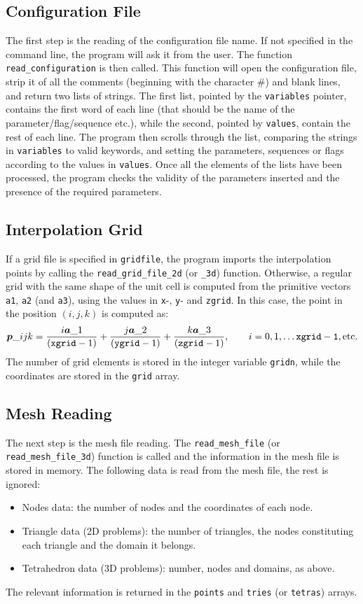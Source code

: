 \documentclass[11pt,a4paper,oneside]{article}
\begin{document}
\subsection{Configuration File}
The first step is the reading of the configuration file name. If not specified in the command line, the program will ask it from the user.
The function {\tt read\_configuration} is then called. This function will open the configuration file, strip it of all the comments (beginning with the character \#) and blank lines, and return two lists of strings. The first list, pointed by the {\tt variables} pointer, contains the first word of each line (that should be the name of the parameter/flag/sequence etc.), while the second, pointed by {\tt values}, contain the rest of each line. The program then scrolls through the list, comparing the strings in {\tt variables} to valid keywords, and setting the parameters, sequences or flags according to the values in {\tt values}. Once all the elements of the lists have been processed, the program checks the validity of the parameters inserted and the presence of the required parameters.

\subsection{Interpolation Grid}
If a grid file is specified in {\tt gridfile}, the program imports the interpolation points by calling the {\tt read\_grid\_file\_2d} (or {\tt \_3d}) function. Otherwise, a regular grid with the same shape of the unit cell is computed from the primitive vectors {\tt a1}, {\tt a2} (and {\tt a3}), using the values in {\tt x}-, {\tt y}- and {\tt zgrid}. In this case, the point in the position $(i, j, k)$ is computed as:
\begin{equation}
\boldsymbol{p}\_{ijk} = \frac{i \boldsymbol{a}\_1}{({\tt xgrid} - 1)} + \frac{j \boldsymbol{a}\_2}{({\tt ygrid} - 1)} + \frac{k \boldsymbol{a}\_3}{({\tt zgrid} - 1)}, \qquad i = 0, 1, \dots {\tt xgrid - 1}, \text{etc.}
\end{equation}
The number of grid elements is stored in the integer variable {\tt gridn}, while the coordinates are stored in the {\tt grid} array.

\subsection{Mesh Reading}
The next step is the mesh file reading. The {\tt read\_mesh\_file} (or {\tt read\_mesh\_file\_3d}) function is called and the information in the mesh file is stored in memory. The following data is read from the mesh file, the rest is ignored:
\begin{itemize}
\item Nodes data: the number of nodes and the coordinates of each node.
\item Triangle data (2D problems): the number of triangles, the nodes constituting each triangle and the domain it belongs.
\item Tetrahedron data (3D problems): number, nodes and domains, as above.
\end{itemize}
The relevant information is returned in the {\tt points} and {\tt tries} (or {\tt tetras}) arrays.
\end{document}
